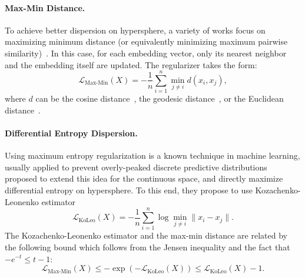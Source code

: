 \documentclass[10pt]{article} %
\begin{document}
\paragraph{Max-Min Distance.}
To achieve better dispersion on hypersphere, a variety of works focus on maximizing minimum distance (or equivalently minimizing maximum pairwise similarity)~\citep{mettes2019hyperspherical,wang2020mmadispersion, pmlr-v130-liu21d}. In this case, for each embedding vector, only its nearest neighbor and the embedding itself are updated. The regularizer takes the form:
\begin{equation}
    \label{eq:min-max-d}
    \mathcal{L}_{\text{Max-Min}}(X) = -\frac{1}{n} \sum_{i=1}^n \min_{j \neq i} d(x_i,x_j),
\end{equation}
where $d$ can be the cosine distance~\citep[MMCS,][]{mettes2019hyperspherical}, the geodesic distance~\citep[MMA,][]{wang2020mmadispersion}, or the Euclidean distance~\citep{pmlr-v130-liu21d}.

\paragraph{Differential Entropy Dispersion.}
Using maximum entropy regularization is a known technique in machine learning, usually applied to prevent overly-peaked discrete predictive distributions \citep{meister-etal-2020-generalized,ahmed2019understanding,pereyra2017regularizing,NEURIPS2018_e44fea3b} %
\citet{sablayrolles2018spreading} proposed to extend this idea for the continuous space, and directly maximize differential entropy on hypersphere. To this end, they propose to use Kozachenko-Leonenko estimator~\citep{kozachenko1987sample}
\begin{equation}
    \label{eq:koleo}
    \mathcal{L}_{\text{KoLeo}}(X) = -\frac{1}{n}\sum_{i=1}^n \log \min_{j \neq i} \|x_i-x_j\|.
\end{equation}
The Kozachenko-Leonenko estimator and the max-min distance are related by the following bound which follows from the Jensen inequality and the fact that $-e^{-t} \leq t-1$:
\begin{equation}
    \mathcal{L}_{\text{Max-Min}}(X) \leq
    -\exp\left(-\mathcal{L}_{\text{KoLeo}}(X)\right) \leq 
    \mathcal{L}_{\text{KoLeo}}(X) - 1.
\end{equation}
\end{document}
